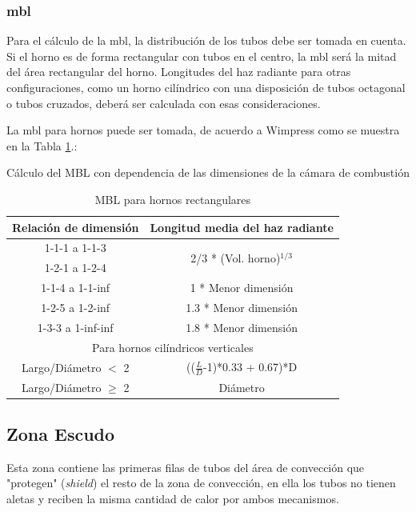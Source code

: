 \subsubsection{\ac{mbl}}
\par Para el cálculo de la \ac{mbl}, la distribución de los tubos debe ser tomada en cuenta. Si el horno es de forma rectangular con tubos en el centro, la \ac{mbl} será la mitad del área rectangular del horno. Longitudes del haz radiante para otras configuraciones, como un horno cilíndrico con una disposición de tubos octagonal o tubos cruzados, deberá ser calculada con esas consideraciones.
\par La \ac{mbl} para hornos puede ser tomada, de acuerdo a Wimpress\cite{bib:wimpress} como se muestra en la Tabla \ref{tbl:mbl}.:
\begin{table}
\caption[Calculo del MBL]{Cálculo del MBL con dependencia de las dimensiones de la cámara de combustión}
\label{tbl:mbl}
    \centering
    \begin{tabular}{c|c}
        Relación de dimensión  & Longitud media del haz radiante \\
        \hline
        1-1-1 a 1-1-3   & \multirow{2}{10em}{2/3 * (Vol. horno)$^{1/3}$} \\
        1-2-1 a 1-2-4   & \\
        \hline
        1-1-4 a 1-1-inf & 1 * Menor dimensión \\
        \hline
        1-2-5 a 1-2-inf   & 1.3 * Menor dimensión \\
        \hline
        1-3-3 a 1-inf-inf & 1.8 * Menor dimensión \\
        \hline
        \multicolumn{2}{c}{Para hornos cilíndricos verticales} \\
        \hline
        Largo/Diámetro $<$ 2  & (($\frac{L}{D}$-1)*0.33 + 0.67)*D\\
        \hline
        Largo/Diámetro $\geq$ 2 & Diámetro\\
    \end{tabular}
    \caption{MBL para hornos rectangulares}
    \label{tbl:mbl}
\end{table}

\subsection{Zona Escudo}
\par Esta zona contiene las primeras filas de tubos del área de convección que "protegen" (\textit{shield}) el resto de la zona de convección, en ella los tubos no tienen aletas y reciben la misma cantidad de calor por ambos mecanismos.

